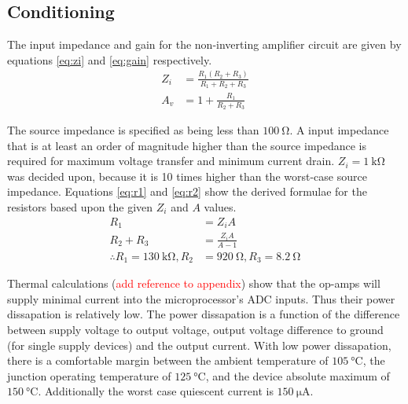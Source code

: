 \subsection{Conditioning}
\label{ap:conditioning}

The input impedance and gain for the non-inverting amplifier circuit are given by equations \ref{eq:zi} and \ref{eq:gain} respectively.
\begin{align}
	Z_i &= \frac{R_1 (R_2 + R_3)}{R_1 + R_2 + R_3} \label{eq:zi} \\
	A_v &= 1 + \frac{R_1}{R_2 + R_3}\label{eq:gain}
\end{align}

The source impedance is specified as being less than $\SI{100}{\ohm}$.
A input impedance that is at least an order of magnitude higher than the source impedance is required for maximum voltage transfer and minimum current drain.
$Z_i = \SI{1}{\kilo\ohm}$ was decided upon, because it is 10 times higher than the worst-case source impedance.
Equations \ref{eq:r1} and \ref{eq:r2} show the derived formulae for the resistors based upon the given $Z_i$ and $A$ values.
\begin{align}
	R_1 &= Z_i A \label{eq:r1} \\
	R_2 + R_3 &= \frac{Z_i A}{A - 1} \label{eq:r2} \\[1em]
	\therefore R_1 = \SI{130}{\kilo\ohm}, R_2 &= \SI{920}{\ohm}, R_3 = \SI{8.2}{\ohm} \nonumber
\end{align}

Thermal calculations (\textcolor{red}{add reference to appendix}) show that the op-amps will supply minimal current into the microprocessor's ADC inputs.
Thus their power dissapation is relatively low.
The power dissapation is a function of the difference between supply voltage to output voltage, output voltage difference to ground (for single supply devices) and the output current.
With low power dissapation, there is a comfortable margin between the ambient temperature of $\SI{105}{\degreeCelsius}$, the junction operating temperature of $\SI{125}{\degreeCelsius}$, and the device absolute maximum of $\SI{150}{\degreeCelsius}$.
Additionally the worst case quiescent current is $\SI{150}{\micro\ampere}$.
